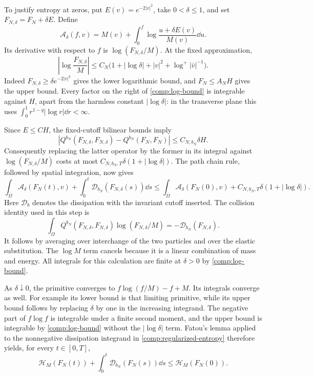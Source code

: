 To justify entropy at zeros, put \(E(v)=e^{-2|v|^2}\), take
\(0<\delta\leq1\), and set \(F_{N,\delta}=F_N+\delta E\). Define
\[
\mathcal A_\delta(f,v)
=M(v)+\int_0^f\log\frac{u+\delta E(v)}{M(v)}\dd u.
\]
Its derivative with respect to \(f\) is
\(\log(F_{N,\delta}/M)\). At the fixed approximation,
\begin{equation}\label{comp:log-bound}
\left|\log\frac{F_{N,\delta}}M\right|
\leq C_N\bigl(1+|\log\delta|+|v|^2
                   +\log^+|\bar v|^{-1}\bigr).
\end{equation}
Indeed \(F_{N,\delta}\geq\delta e^{-2|v|^2}\) gives the lower
logarithmic bound, and \(F_N\leq A_NH\) gives the upper bound.
Every factor on the right of \eqref{comp:log-bound} is integrable
against \(H\), apart from the harmless constant \(|\log\delta|\): in
the transverse plane this uses
\(\int_0^1 r^{1-q}|\log r|\dd r<\infty\).

Since \(E\leq C H\), the fixed-cutoff bilinear bounds imply
\[
|Q^{b_N}(F_{N,\delta},F_{N,\delta})
            -Q^{b_N}(F_N,F_N)|\leq C_{N,b_N}\delta H.
\]
Consequently replacing the latter operator by the former in its
integral against \(\log(F_{N,\delta}/M)\) costs at most
\(C_{N,b_N,T}\delta(1+|\log\delta|)\).
The path chain rule, followed by spatial integration, now gives
\begin{equation}\label{comp:regularized-entropy}
\int_\Omega\mathcal A_\delta(F_N(t),v)
 +\int_0^t\mathcal D_{b_N}(F_{N,\delta}(s))\dd s
\leq\int_\Omega\mathcal A_\delta(F_N(0),v)
       +C_{N,b_N,T}\delta(1+|\log\delta|).
\end{equation}
Here \(\mathcal D_b\) denotes the dissipation with the invariant
cutoff inserted. The collision identity used in this step is
\[
\int_\Omega Q^{b_N}(F_{N,\delta},F_{N,\delta})
       \log(F_{N,\delta}/M)
=-\mathcal D_{b_N}(F_{N,\delta}).
\]
It follows by averaging over interchange of the two particles and over
the elastic substitution. The \(\log M\) term cancels because it is a
linear combination of mass and energy. All integrals for this calculation
are finite at \(\delta>0\) by \eqref{comp:log-bound}.

As \(\delta\downarrow0\), the primitive converges to
\(f\log(f/M)-f+M\). Its integrals converge as well. For example its
lower bound is that limiting primitive, while its upper bound follows
by replacing \(\delta\) by one in the increasing integrand. The
negative part of \(f\log f\) is integrable under a finite second
moment, and the upper bound is integrable by \eqref{comp:log-bound}
without the \(|\log\delta|\) term. Fatou's lemma applied to the
nonnegative dissipation integrand in \eqref{comp:regularized-entropy}
therefore yields, for every \(t\in[0,T]\),
\begin{equation}\label{comp:finite-entropy}
\mathcal H_M(F_N(t))+\int_0^t\mathcal D_{b_N}(F_N(s))\dd s
\leq\mathcal H_M(F_N(0)).
\end{equation}


